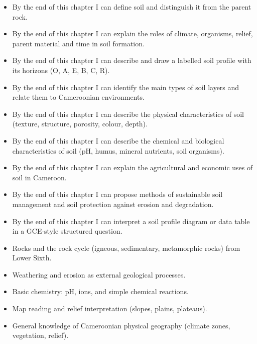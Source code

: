 \documentclass[11pt]{article}
\begin{document}
\begin{objectifs}
\begin{itemize}
\item By the end of this chapter I can define soil and distinguish it from the parent rock.
\item By the end of this chapter I can explain the roles of climate, organisms, relief, parent material and time in soil formation.
\item By the end of this chapter I can describe and draw a labelled soil profile with its horizons (O, A, E, B, C, R).
\item By the end of this chapter I can identify the main types of soil layers and relate them to Cameroonian environments.
\item By the end of this chapter I can describe the physical characteristics of soil (texture, structure, porosity, colour, depth).
\item By the end of this chapter I can describe the chemical and biological characteristics of soil (pH, humus, mineral nutrients, soil organisms).
\item By the end of this chapter I can explain the agricultural and economic uses of soil in Cameroon.
\item By the end of this chapter I can propose methods of sustainable soil management and soil protection against erosion and degradation.
\item By the end of this chapter I can interpret a soil profile diagram or data table in a GCE-style structured question.
\end{itemize}
\end{objectifs}

\begin{prerequis}
\begin{itemize}
\item Rocks and the rock cycle (igneous, sedimentary, metamorphic rocks) from Lower Sixth.
\item Weathering and erosion as external geological processes.
\item Basic chemistry: pH, ions, and simple chemical reactions.
\item Map reading and relief interpretation (slopes, plains, plateaus).
\item General knowledge of Cameroonian physical geography (climate zones, vegetation, relief).
\end{itemize}
\end{prerequis}

\newpage
\end{document}
